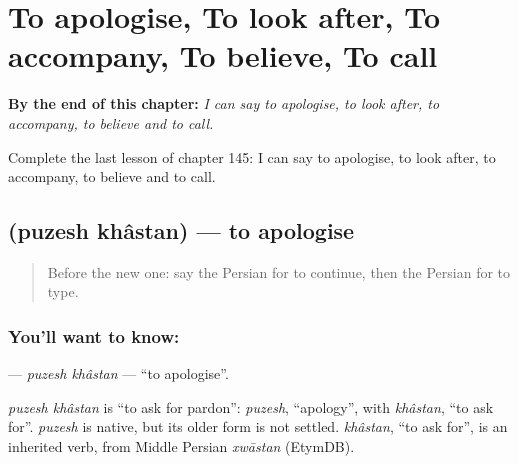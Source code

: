 
\chapter{To apologise, To look after, To accompany, To believe, To call}
\label{ch:fa-to-apologise-to-look-after-to-accompany-to-believe-to-call}

\begin{chapteropening}
\textbf{By the end of this chapter:} \emph{I can say to apologise, to look after, to accompany, to believe and to call.}

Complete the last lesson of chapter 145: I can say to apologise, to look after, to accompany, to believe and to call.
\end{chapteropening}

\section[\texorpdfstring{\fa{پوزش} \fa{خواستن} (puzesh khâstan)}{پوزش خواستن (puzesh khâstan)}]{  (puzesh khâstan) — to apologise}

\label{lesson:FA-C145-puzesh-khastan}



\begin{quote}
Before the new one: say the Persian for to continue, then the Persian for to type.
\end{quote}

\subsection*{You'll want to know:  }
\textbf{ } — \emph{puzesh khâstan} — \textquotedblleft{}to apologise\textquotedblright{}.

\begin{cousinweb}
\emph{puzesh khâstan} is \textquotedblleft{}to ask for pardon\textquotedblright{}: \emph{puzesh}, \textquotedblleft{}apology\textquotedblright{}, with \emph{khâstan}, \textquotedblleft{}to ask for\textquotedblright{}. \emph{puzesh} is native, but its older form is not settled. \emph{khâstan}, \textquotedblleft{}to ask for\textquotedblright{}, is an inherited verb, from Middle Persian \emph{xwāstan} (EtymDB).
\end{cousinweb}

